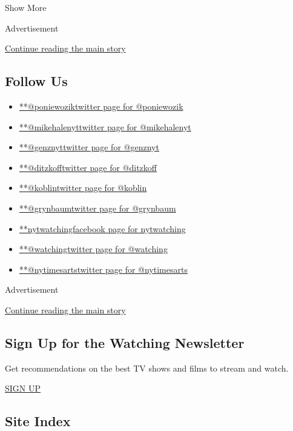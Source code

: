 Show More

Advertisement

\protect\hyperlink{after-mid2}{Continue reading the main story}

\hypertarget{follow-us}{%
\subsection{Follow Us}\label{follow-us}}

\begin{itemize}
\tightlist
\item
  \href{https://twitter.com/poniewozik}{**@poniewoziktwitter page for
  @poniewozik}
\item
  \href{https://twitter.com/mikehalenyt}{**@mikehalenyttwitter page for
  @mikehalenyt}
\item
  \href{https://twitter.com/genznyt}{**@genznyttwitter page for
  @genznyt}
\item
  \href{https://twitter.com/ditzkoff}{**@ditzkofftwitter page for
  @ditzkoff}
\item
  \href{https://twitter.com/koblin}{**@koblintwitter page for @koblin}
\item
  \href{https://twitter.com/grynbaum}{**@grynbaumtwitter page for
  @grynbaum}
\item
  \href{https://www.facebook.com/nytwatching}{**nytwatchingfacebook page
  for nytwatching}
\item
  \href{https://twitter.com/watching}{**@watchingtwitter page for
  @watching}
\item
  \href{https://twitter.com/nytimesarts}{**@nytimesartstwitter page for
  @nytimesarts}
\end{itemize}

Advertisement

\protect\hyperlink{after-mktg}{Continue reading the main story}

\hypertarget{sign-up-for-the-watching-newsletter}{%
\subsection{Sign Up for the Watching
Newsletter}\label{sign-up-for-the-watching-newsletter}}

Get recommendations on the best TV shows and films to stream and watch.

\href{/newsletters/signup/WG}{SIGN UP}

\hypertarget{site-index}{%
\subsection{Site Index}\label{site-index}}

